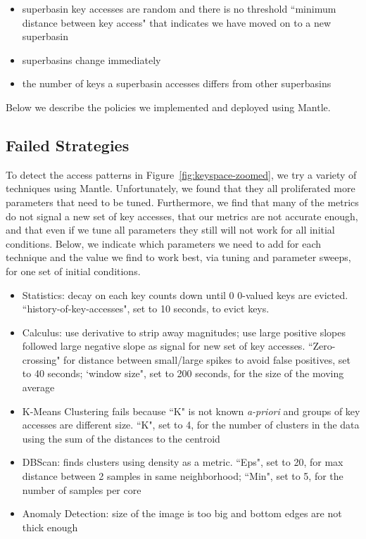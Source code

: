 \begin{itemize}

  \item superbasin key accesses are random and there is no threshold ``minimum distance
  between key access" that indicates we have moved on to a new superbasin

  \item superbasins change immediately

  \item the number of keys a superbasin accesses differs from other superbasins

\end{itemize}

Below we describe the policies we implemented and deployed using Mantle.

\subsection{Failed Strategies}

To detect the access patterns in Figure~\ref{fig:keyspace-zoomed}, we try a
variety of techniques using Mantle. Unfortunately, we found that they all
proliferated more parameters that need to be tuned. Furthermore, we find that
many of the metrics do not signal a new set of key accesses, that our metrics
are not accurate enough, and that even if we tune all parameters they still
will not work for all initial conditions.  Below, we indicate which parameters
we need to add for each technique and the value we find to work best, via
tuning and parameter sweeps, for one set of initial conditions.

\begin{itemize}

  \item Statistics: decay on each key counts down until 0 0-valued keys are
evicted.  ``history-of-key-accesses", set to 10 seconds, to evict keys.

  \item Calculus: use derivative to strip away magnitudes; use large positive
slopes followed large negative slope as signal for new set of key accesses.
``Zero-crossing" for distance between small/large spikes to avoid false
positives, set to 40 seconds; `window size", set to 200 seconds, for the size
of the moving average 

  \item K-Means Clustering fails because ``K" is not known {\it a-priori} and
groups of key accesses are different size. ``K", set to 4, for the number of clusters in the data
using the sum of the distances to the centroid

  \item DBScan: finds clusters using density as a metric. ``Eps", set to 20, for
max distance between 2 samples in same neighborhood; ``Min", set to 5, for the
number of samples per core

  \item Anomaly Detection: size of the image is too big and bottom edges are
not thick enough

\end{itemize}

